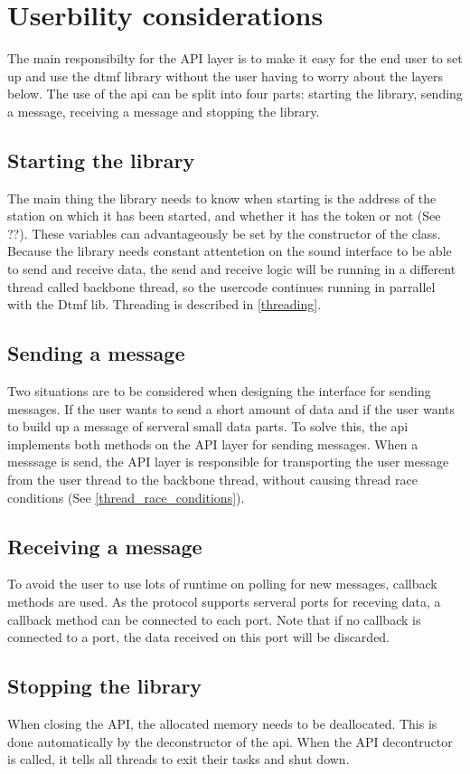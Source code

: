 \section{Userbility considerations}
The main responsibilty for the API layer is to make it easy for the end user to set up and use the dtmf library without the user having to worry about the layers below. The use of the api can be split into four parts: starting the library, sending a message, receiving a message and stopping the library. 

\subsection{Starting the library}
The main thing the library needs to know when starting is the address of the station on which it has been started, and whether it has the token or not (See ??). These variables can  advantageously be set by the constructor of the class. Because the library needs constant attentetion on the sound interface to be able to send and receive data, the send and receive logic will be running in a different thread called backbone thread, so the usercode continues running in parrallel with the Dtmf lib. Threading is described in \ref{threading}.

\subsection{Sending a message}
Two situations are to be considered when designing the interface for sending messages. If the user wants to send a short amount of data and if the user wants to build up a message of serveral small data parts. To solve this, the api implements both methods on the API layer for sending messages. When a messsage is send, the API layer is responsible for transporting the user message from the user thread to the backbone thread, without causing thread race conditions (See \ref{thread_race_conditions}).

\subsection{Receiving a message}
To avoid the user to use lots of runtime on polling for new messages, callback methods are used. As the protocol supports serveral ports for receving data, a callback method can be connected to each port. Note that if no callback is connected to a port, the data received on this port will be discarded.

\subsection{Stopping the library}
When closing the API, the allocated memory needs to be deallocated. This is done automatically by the deconstructor of the api. When the API decontructor is called, it tells all threads to exit their tasks and shut down.

